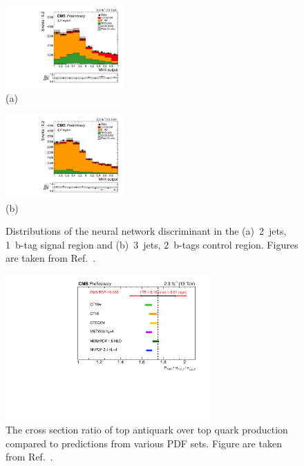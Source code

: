 \documentclass{PoS}
\begin{document}
\begin{figure}[htbp]
\begin{center}
\parbox[t]{0.49\textwidth}{\centering\includegraphics[width=0.4\textwidth]{figures/tchannel/2j1t_BDT.pdf}\\(a)}
\parbox[t]{0.49\textwidth}{\centering\includegraphics[width=0.4\textwidth]{figures/tchannel/3j1t_BDT.pdf}\\(b)}
\caption{\label{fig:TOP-16-003-2j1t-NN}Distributions of the neural network discriminant in the (a)~2~jets, 1~b-tag signal region and (b)~3~jets, 2~b-tags \ttbar control region. Figures are taken from Ref.~\cite{CMS-PAS-TOP-16-003}.}
\end{center}
\end{figure}



\begin{figure}[htbp]
\begin{center}
\includegraphics[width=0.7\textwidth]{figures/tchannel/ratio.pdf}
\caption{\label{fig:TOP-16-003-2j1t-R}The cross section ratio of top antiquark over top quark production compared to predictions from various PDF sets. Figure are taken from Ref.~\cite{CMS-PAS-TOP-16-003}.}
\end{center}
\end{figure}
\end{document}
